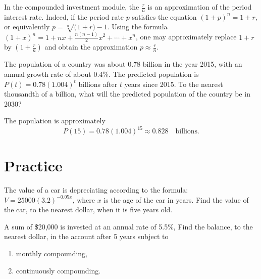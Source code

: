\documentclass[en,12pt]{elegantbook}
\providecommand{\tightlist}{%
  \setlength{\itemsep}{0pt}\setlength{\parskip}{0pt}}
\newenvironment{rmdnote}{
    \par\noindent
    \makebox[-\width][r]{
    \tiny\color{red!90}
    \textdbend
    \hspace*{2pt}
    }
    \makebox[\width][l]{
        \hspace*{3pt}
        \textbf{
            \color{second}
            Note 
        }
    }
    \begin{shaded}
    \itshape
}{
    \par
    \end{shaded}
}
\providecommand{\tightlist}{%
  \setlength{\itemsep}{0pt}\setlength{\parskip}{0pt}}
\let\BeginKnitrBlock\begin \let\EndKnitrBlock\end
\begin{document}
\begin{rmdnote}

In the compounded investment module, the \(\frac rn\) is an approximation of the period interest rate. Indeed, if the period rate \(p\) satisfies the equation \((1+p)^n=1+r\), or equivalently \(p=\sqrt[n](1+r) - 1\). Using the formula \((1+x)^n=1+nx+\frac{n(n-1)}{2}x^2+\cdots +x^n\), one may approximately replace \(1+r\) by \((1+\frac rn)\) and obtain the approximation \(p\approx \frac rn\).

\end{rmdnote}

\BeginKnitrBlock{example}
\protect\hypertarget{exm:unnamed-chunk-279}{}{\label{exm:unnamed-chunk-279} }
The population of a country was about 0.78 billion in the year 2015, with an annual growth rate of about 0.4\%.
The predicted population is \(P(t)=0.78(1.004)^t\) billions after \(t\) years since 2015.
To the nearest thousandth of a billion, what will the predicted population of the country be in 2030?
\EndKnitrBlock{example}

\BeginKnitrBlock{solution}


The population is approximately
\[
P(15)=0.78(1.004)^{15}\approx 0.828 \quad \text{billions}.
\]
\EndKnitrBlock{solution}

\hypertarget{practice-15}{%
\section{Practice}\label{practice-15}}

\BeginKnitrBlock{exercise}
\protect\hypertarget{exr:unnamed-chunk-281}{}{\label{exr:unnamed-chunk-281} }
The value of a car is depreciating according to the formula: \(V=25000(3.2)^{-0.05x}\),
where \(x\) is the age of the car in years.
Find the value of the car, to the nearest dollar, when it is five years old.
\EndKnitrBlock{exercise}

\BeginKnitrBlock{exercise}
\protect\hypertarget{exr:unnamed-chunk-282}{}{\label{exr:unnamed-chunk-282} }
A sum of \$20,000 is invested at an annual rate of 5.5\%, Find the balance, to the nearest dollar,
in the account after 5 years subject to

\begin{enumerate}
\def\labelenumi{\arabic{enumi}.}
\tightlist
\item
  monthly compounding,
\item
  continuously compounding.
\end{enumerate}
\EndKnitrBlock{exercise}
\end{document}
